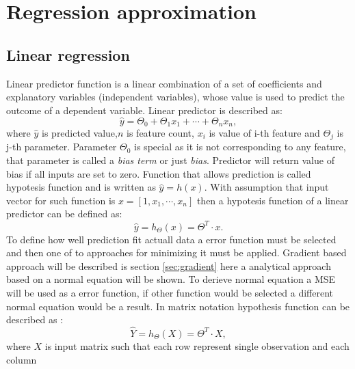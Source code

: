 \section{Regression approximation}
\FloatBarrier

\subsection{Linear regression}
\FloatBarrier
\label{sec:linear_regression}
Linear predictor function is a linear combination of a set of coefficients and explanatory 
variables (independent variables), whose value is used to predict the outcome of a
dependent variable. Linear predictor is described as:
\begin{equation}
	\label{equ:linear_predictior}
	\hat{y} = \Theta_{0} + \Theta_{1}x_{1} + \cdots + \Theta_{n}x_{n},
\end{equation}
where $\hat{y}$ is predicted value,$n$ is feature count, $x_{i}$ is value of i-th feature
and $\Theta_{j}$ is j-th parameter.
Parameter $\Theta_{0}$ is special as it is not corresponding to any feature, that parameter
is called a \textit{bias term} or just \textit{bias}.
Predictor will return value of bias if all inputs are set to zero.
Function that allows prediction is called hypotesis function and is written as $\hat{y} = h(x)$.
With assumption that input vector for such function is $x=[1, x_{1}, \cdots, x_{n}]$ then 
a hypotesis function of a linear predictor can be defined as:
\begin{equation}
	\label{equ:linear_hyp}
	\hat{y} = h_{\Theta}(x) = \Theta^{T}\cdot x.
\end{equation}
To define how well prediction fit actuall data a error function must be selected and then one
of to approaches for minimizing it must be applied. Gradient based approach will be described 
is section \ref{sec:gradient} here a analytical approach based on a normal equation will be shown.
To derieve normal equation a MSE will be used as a error function, if other function would be 
selected a different normal equation would be a result.
In matrix notation hypothesis function can be described as :
\begin{equation}
	\label{equ:linear_hyp_matirx}
	\hat{Y} = h_{\Theta}(X) = \Theta^{T}\cdot X,
\end{equation}
where $X$ is input matrix such that each row represent single observation and each column 
